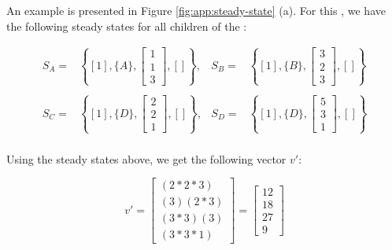 An example is presented in Figure \ref{fig:app:steady-state} (a).
For this {\pipeline}, we have the following steady states for all
children of the {\pipeline}:

\begin{displaymath}
\begin{array}{lrlr}
S_A = & \left\{[1], \{A\}, { \left[
\begin{array}{c} 1 \\ 1 \\ 3
\end{array}
\right]}, [] \right\}, &

S_B = & \left\{[1], \{B\}, { \left[
\begin{array}{c} 3 \\ 2 \\ 3
\end{array}
\right]}, [] \right\} \\ \\

S_C = & \left\{[1], \{D\}, { \left[
\begin{array}{c} 2 \\ 2 \\ 1
\end{array}
\right]}, [] \right\}, &

S_D = & \left\{[1], \{D\}, { \left[
\begin{array}{c} 5 \\ 3 \\ 1
\end{array}
\right]}, [] \right\} \\

\end{array}
\end{displaymath}

Using the steady states above, we get the following vector $v'$:

\begin{displaymath}
v' = \left[
\begin{array}{c}
(2 * 2 * 3)\\
(3) (2 * 3) \\
(3 * 3) (3) \\
(3 * 3 * 1)
\end{array}
\right] = \left[
\begin{array}{c}
12\\ 18\\ 27\\ 9
\end{array}
\right]
\end{displaymath}

